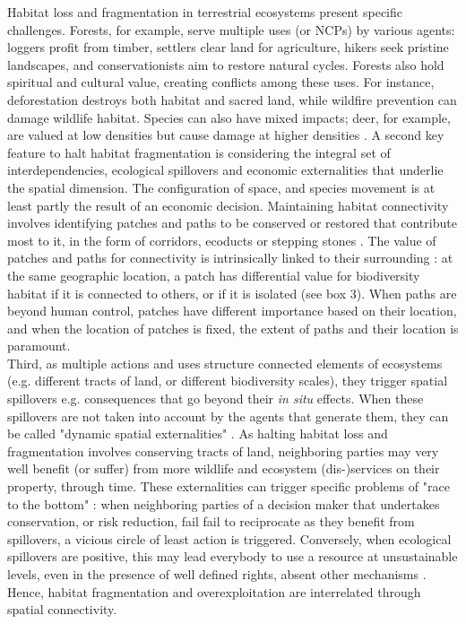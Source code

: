 Habitat loss and fragmentation in terrestrial ecosystems present specific challenges. Forests, for example, serve multiple uses (or NCPs) by various agents: loggers profit from timber, settlers clear land for agriculture, hikers seek pristine landscapes, and conservationists aim to restore natural cycles. Forests also hold spiritual and cultural value, creating conflicts among these uses. For instance, deforestation destroys both habitat and sacred land, while wildfire prevention can damage wildlife habitat. Species can also have mixed impacts; deer, for example, are valued at low densities but cause damage at higher densities \citep{putman_identifying_2011}. 
A second key feature to halt habitat fragmentation is considering the integral set of interdependencies, ecological spillovers and economic externalities that underlie the spatial dimension. The configuration of space, and species movement is at least partly the result of an economic decision. Maintaining habitat connectivity involves identifying patches and paths to be conserved or restored that contribute most to it, in the form of corridors, ecoducts or stepping stones \citep{Turner2005, Turner2011}. The value of patches and paths for connectivity is intrinsically linked to their surrounding : at the same geographic location, a patch has differential value for biodiversity habitat if it is connected to others, or if it is isolated (see box 3). When paths are beyond human control, patches have different importance based on their location, and when the location of patches is fixed, the extent of paths and their location is paramount.
\\
Third, as multiple actions and uses structure connected elements of ecosystems (e.g. different tracts of land, or different biodiversity scales), they trigger spatial spillovers e.g. consequences that go beyond their \textit{in situ} effects. When these spillovers are not taken into account by the agents that generate them, they can be called "dynamic spatial externalities" \citep{sanchirico_bioeconomics_1999, costello_optimal_2008, costello_private_2017}. As halting habitat loss and fragmentation involves conserving tracts of land, neighboring parties may very well benefit (or suffer) from more wildlife and ecosystem (dis-)services on their property, through time. These externalities can trigger specific problems of "race to the bottom" \citep{costello_private_2017} : when neighboring parties of a decision maker that undertakes conservation, or risk reduction, fail fail to reciprocate as they benefit from spillovers, a vicious circle of least action is triggered. Conversely, when ecological spillovers are positive, this may lead everybody to use a resource at unsustainable levels, even in the presence of well defined rights, absent other mechanisms \citep{janmaat_sharing_2005,kaffine_unitization_2010}. Hence, habitat fragmentation and overexploitation are interrelated through spatial connectivity. 
